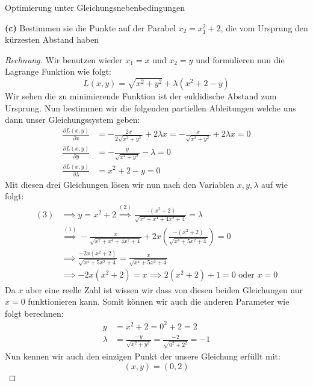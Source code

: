 \documentclass[a4paper]{article}
\newenvironment{Aufgabe}[2][Aufgabe]{\begin{trivlist}
\item[\hskip \labelsep {\bfseries #1}\hskip \labelsep {\bfseries #2.}]}{\end{trivlist}}
\begin{document}
\begin{theorem} %
\begin{Aufgabe}{13} %
	Optimierung unter Gleichungsnebenbedingungen
\end{Aufgabe}

\textbf{(c)}  Bestimmen sie die Punkte auf der Parabel $x_2 = x_1 ^2 + 2$, die vom Ursprung
den kürzesten Abstand haben

\begin{proof}[Rechnung]
	Wir benutzen wieder $x_1 = x$ und $x_2 = y$ und formulieren nun die Lagrange Funktion wie folgt:
	\[
		L(x,y) = \sqrt{x ^2 + y ^2} + \lambda ( x ^2 + 2 - y )
	\] 
	Wir sehen die zu minimierende Funktion ist der euklidische Abstand zum Ursprung. Nun bestimmen
	wir die folgenden partiellen Ableitungen welche uns dann unser Gleichungssystem geben:
	\begin{align}
		\frac{ \partial L(x,y) }{ \partial x } &= - \frac{ 2 x }{ 2 \sqrt{x ^2 + y ^2}  } + 2 \lambda x
		= - \frac{ x }{ \sqrt{x ^2 + y ^2}  } + 2 \lambda x = 0 \\
		\frac{ \partial L(x,y) }{ \partial y } &= -\frac{ y }{ \sqrt{x ^2 + y ^2}  } - \lambda = 0 \\
		\frac{ \partial L(x,y) }{ \partial \lambda } &= x ^2 + 2 - y = 0
	\end{align}
	Mit diesen drei Gleichungen lösen wir nun nach den Variablen $x, y, \lambda$ auf wie folgt:
	\begin{align*}
		(3) & \implies y = x ^2 + 2 \overset{(2)} \implies \frac{-( x ^2 + 2)}{
			\sqrt{x ^2 + x ^4 + 4x ^2 + 4} 
		} = \lambda \\
		& \overset{(1)} \implies -\frac{ x }{ \sqrt{x ^2 + x ^{4} + 4 x ^2 + 4}  }
		+ 2 x \left(
			\frac{ - ( x ^2 + 2 ) }{ \sqrt{x ^{4} + 5 x ^2 + 4}  }
		\right) = 0 \\
		& \implies \frac{ - 2x (x ^2 + 2) }{ \sqrt{x ^{4} + 5 x ^2 + 4}  }
		= \frac{ x }{ \sqrt{x ^{4} + 5 x ^2 + 4}  } \\
		& \implies -2x ( x ^2 + 2 ) = x
		\implies 2 ( x ^2 + 2 ) + 1 = 0
		\text{ oder } x = 0
	\end{align*}
	Da $x$ aber eine reelle Zahl ist wissen wir dass von diesen beiden Gleichungen nur $x = 0$ funktionieren
	kann. Somit können wir auch die anderen Parameter wie folgt berechnen:
	\begin{align*}
		y &= x ^2 + 2 = 0 ^2 + 2 = 2 \\
		\lambda &= \frac{ -y }{ \sqrt{x ^2 + y ^2}  }
		= \frac{ -2 }{ \sqrt{0 ^2 + 2 ^2}  } = -1
	\end{align*}
	Nun kennen wir auch den einzigen Punkt der unsere Gleichung erfüllt mit:
	\[
		(x,y) = (0, 2)
	\] 
\end{proof}
\end{theorem}
\end{document}
